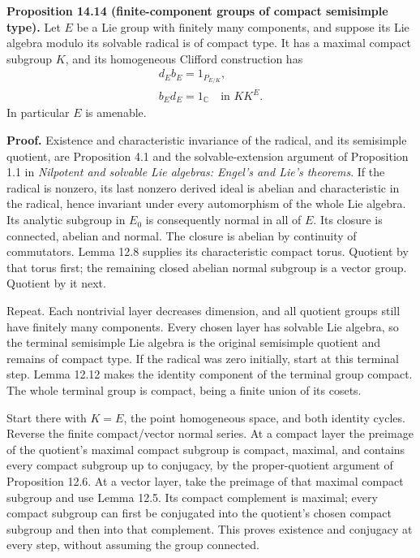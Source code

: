 \documentclass[
  11pt,
]{article}
\begin{document}
\textbf{Proposition 14.14 (finite-component groups of compact semisimple
type).} Let \(E\) be a Lie group with finitely many components, and
suppose its Lie algebra modulo its solvable radical is of compact type.
It has a maximal compact subgroup \(K\), and its homogeneous Clifford
construction has \[
\begin{gathered}
d_Eb_E=1_{P_{E/K}},\\
b_Ed_E=1_{\mathbb C}
\quad\text{in }KK^E.
\end{gathered}
\tag{14.53}
\] In particular \(E\) is amenable.

\textbf{Proof.} Existence and characteristic invariance of the radical,
and its semisimple quotient, are Proposition 4.1 and the
solvable-extension argument of Proposition 1.1 in \emph{Nilpotent and
solvable Lie algebras: Engel's and Lie's theorems}. If the radical is
nonzero, its last nonzero derived ideal is abelian and characteristic in
the radical, hence invariant under every automorphism of the whole Lie
algebra. Its analytic subgroup in \(E_0\) is consequently normal in all
of \(E\). Its closure is connected, abelian and normal. The closure is
abelian by continuity of commutators. Lemma 12.8 supplies its
characteristic compact torus. Quotient by that torus first; the
remaining closed abelian normal subgroup is a vector group. Quotient by
it next.

Repeat. Each nontrivial layer decreases dimension, and all quotient
groups still have finitely many components. Every chosen layer has
solvable Lie algebra, so the terminal semisimple Lie algebra is the
original semisimple quotient and remains of compact type. If the radical
was zero initially, start at this terminal step. Lemma 12.12 makes the
identity component of the terminal group compact. The whole terminal
group is compact, being a finite union of its cosets.

Start there with \(K=E\), the point homogeneous space, and both identity
cycles. Reverse the finite compact/vector normal series. At a compact
layer the preimage of the quotient's maximal compact subgroup is
compact, maximal, and contains every compact subgroup up to conjugacy,
by the proper-quotient argument of Proposition 12.6. At a vector layer,
take the preimage of that maximal compact subgroup and use Lemma 12.5.
Its compact complement is maximal; every compact subgroup can first be
conjugated into the quotient's chosen compact subgroup and then into
that complement. This proves existence and conjugacy at every step,
without assuming the group connected.
\end{document}
